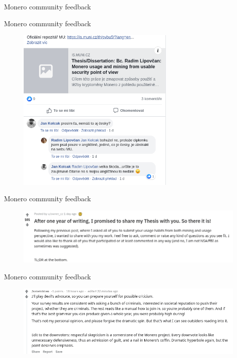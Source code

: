 \documentclass{beamer}
\begin{document}
\begin{darkframes}
        \begin{frame}{Monero community feedback}
     \color{aquamarine}
    \end{frame}
       \begin{frame}{Monero community feedback}
     	\begin{figure}
  \centering
  \includegraphics[width=0.68\textwidth]{community-facebook.png}
\end{figure}
    \end{frame}    
    \begin{frame}{Monero community feedback}
     	\begin{figure}
  \centering
  \includegraphics[width=1\textwidth]{community-reddit.png}
\end{figure}
    \end{frame}
        \begin{frame}{Monero community feedback}
     	\begin{figure}
  \centering
  \includegraphics[width=1\textwidth]{community-redditnext.png}
\end{figure}
    \end{frame}
      

\end{darkframes}
\end{document}
